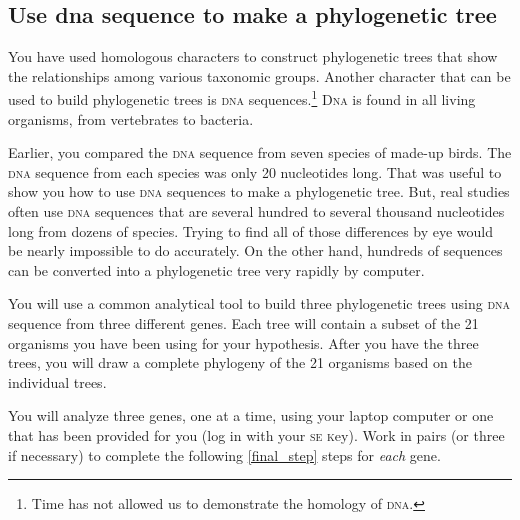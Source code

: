 \documentclass[12pt, hidelinks]{exam}
\newcommand{\dna}{\textsc{dna}}
\begin{document}
\subsection*{Use dna sequence to make a phylogenetic tree}

You have used homologous characters to construct phylogenetic trees that 
show the relationships among various taxonomic groups. Another character
that can be used to build phylogenetic trees is \textsc{dna} sequences.\footnote{Time
has not allowed us to demonstrate the homology of \textsc{dna.}}
D\textsc{na} is found in all living organisms, from vertebrates to bacteria. 


Earlier, you compared the \dna{} sequence from seven species of made-up birds. 
The \dna{} sequence from each species was only 20 nucleotides long. That was useful
to show you how to use \dna{} sequences to make a phylogenetic tree. But, real studies
often use \dna{} sequences that are several hundred to several thousand nucleotides long
from dozens of species. Trying to find all of those differences by eye would be nearly impossible
to do accurately. On the other hand, hundreds of sequences can be converted into a phylogenetic tree very 
rapidly by computer. 

You will use a common analytical tool to build three phylogenetic trees using \dna{} sequence
from three different genes. Each tree will contain a subset of the 21 organisms you have been using for your hypothesis. After you have the three trees, you will draw a complete phylogeny of the 21 organisms based on the individual trees.

You will analyze three genes, one at a time, using your laptop computer or one that has been provided for you (log in with your \textsc{se k}ey).   Work in pairs (or three if necessary) to complete the following \ref{final_step} steps for \emph{each} gene.
\end{document}
